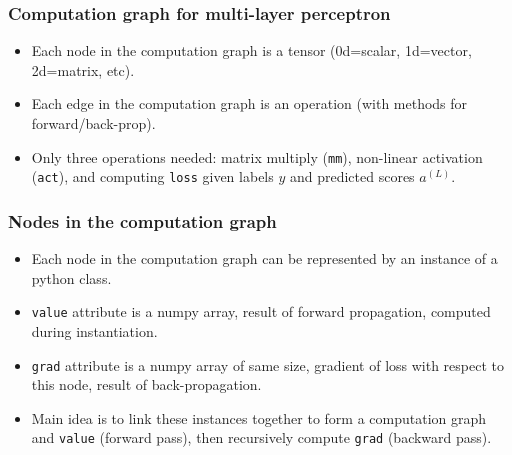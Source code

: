 \documentclass{beamer}
\begin{document}
\begin{frame}
  \frametitle{Computation graph for multi-layer perceptron}
  \begin{itemize}
  \item Each node in the computation graph is a tensor (0d=scalar,
    1d=vector, 2d=matrix, etc).
  \item Each edge in the computation graph is an operation (with
    methods for forward/back-prop).
  \item Only three operations needed: matrix multiply (\texttt{mm}),
    non-linear activation (\texttt{act}), and computing \texttt{loss} given
    labels $y$ and predicted scores $a^{(L)}$.
  \end{itemize}


\end{frame}

\begin{frame}
  \frametitle{Nodes in the computation graph}
  \begin{itemize}
  \item Each node in the computation graph can be represented by an
    instance of a python class.
  \item \texttt{value} attribute is a numpy array, result of forward
    propagation, computed during instantiation.
  \item \texttt{grad} attribute is a numpy array of same size,
    gradient of loss with respect to this node, result of
    back-propagation. 
  \item Main idea is to link these instances together to form a
    computation graph and \texttt{value} (forward pass),
    then recursively compute \texttt{grad} (backward pass).
  \end{itemize}
\end{frame}
\end{document}
